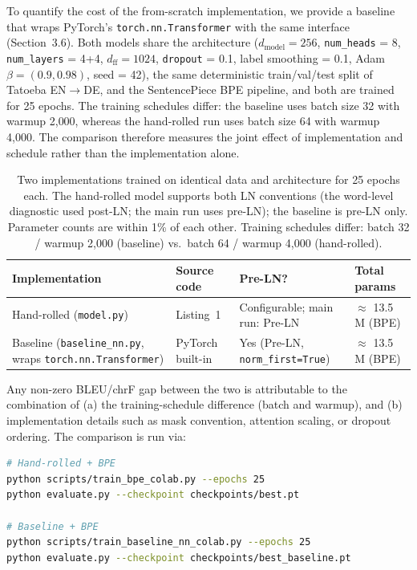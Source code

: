 \documentclass[10pt]{article}
\begin{document}
To quantify the cost of the from-scratch implementation, we provide a baseline that wraps PyTorch's \texttt{torch.nn.Transformer} with the same interface (Section~3.6). Both models share the architecture ($d_{\text{model}} = 256$, \texttt{num\_heads} = 8, \texttt{num\_layers} = 4+4, $d_{\text{ff}} = 1024$, \texttt{dropout} = 0.1, label smoothing = 0.1, Adam $\beta = (0.9, 0.98)$, seed = 42), the same deterministic train/val/test split of Tatoeba EN$\rightarrow$DE, and the SentencePiece BPE pipeline, and both are trained for 25 epochs. The training schedules differ: the baseline uses batch size 32 with warmup 2{,}000, whereas the hand-rolled run uses batch size 64 with warmup 4{,}000. The comparison therefore measures the joint effect of implementation and schedule rather than the implementation alone.

\begin{table}[htbp]
\centering
\small
\begin{tabularx}{\textwidth}{X l l l}
\toprule
\textbf{Implementation} & \textbf{Source code} & \textbf{Pre-LN?} & \textbf{Total params} \\
\midrule
Hand-rolled (\texttt{model.py}) & Listing~1 & Configurable; main run: Pre-LN & $\approx$ 13.5 M (BPE) \\
Baseline (\texttt{baseline\_nn.py}, wraps \texttt{torch.nn.Transformer}) & PyTorch built-in & Yes (Pre-LN, \texttt{norm\_first=True}) & $\approx$ 13.5 M (BPE) \\
\bottomrule
\end{tabularx}
\caption{Two implementations trained on identical data and architecture for 25 epochs each. The hand-rolled model supports both LN conventions (the word-level diagnostic used post-LN; the main run uses pre-LN); the baseline is pre-LN only. Parameter counts are within 1\% of each other. Training schedules differ: batch 32 / warmup 2{,}000 (baseline) vs.\ batch 64 / warmup 4{,}000 (hand-rolled).}
\label{tab:baseline}
\end{table}

Any non-zero BLEU/chrF gap between the two is attributable to the combination of (a) the training-schedule difference (batch and warmup), and (b) implementation details such as mask convention, attention scaling, or dropout ordering. The comparison is run via:
\begin{lstlisting}[language=bash]
# Hand-rolled + BPE
python scripts/train_bpe_colab.py --epochs 25
python evaluate.py --checkpoint checkpoints/best.pt

# Baseline + BPE
python scripts/train_baseline_nn_colab.py --epochs 25
python evaluate.py --checkpoint checkpoints/best_baseline.pt
\end{lstlisting}
\end{document}
